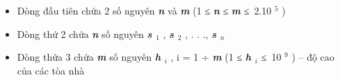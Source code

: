 \begin{itemize}
	\item Dòng đầu tiên chứa 2 số nguyên \textbf{\emph{ n }} và \textbf{\emph{ m }} (1 ≤ \textbf{\emph{ n }} ≤ \textbf{\emph{ m }} ≤ 2.10 $^ 5 $ )
	\item Dòng thứ 2 chứa \textbf{\emph{ n }} số nguyên \textbf{\emph{ s $_ 1 $}} , \textbf{\emph{ s $_ 2 $}} , . . ., \textbf{\emph{ s $_ n $}}
	\item Dòng thứa 3 chứa \textbf{\emph{ m }} số nguyên \textbf{\emph{ h $_ i $}} , i = 1 ÷ \textbf{\emph{ m }} (1 ≤ \textbf{\emph{ h $_ i $}} ≤ 10 $^ 9 $ ) – độ cao của các tòa nhà
\end{itemize}